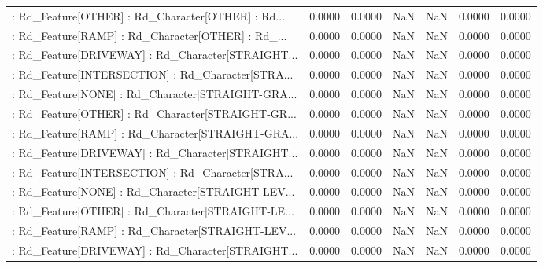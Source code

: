 \begin{longtable}{p{4cm}cccccc}
 : Rd\_Feature[OTHER] : Rd\_Character[OTHER] : Rd... &            0.0000 &            0.0000 &     NaN &          NaN &             0.0000 &            0.0000 \\
 : Rd\_Feature[RAMP] : Rd\_Character[OTHER] : Rd\_... &            0.0000 &            0.0000 &     NaN &          NaN &             0.0000 &            0.0000 \\
 : Rd\_Feature[DRIVEWAY] : Rd\_Character[STRAIGHT... &            0.0000 &            0.0000 &     NaN &          NaN &             0.0000 &            0.0000 \\
 : Rd\_Feature[INTERSECTION] : Rd\_Character[STRA... &            0.0000 &            0.0000 &     NaN &          NaN &             0.0000 &            0.0000 \\
 : Rd\_Feature[NONE] : Rd\_Character[STRAIGHT-GRA... &            0.0000 &            0.0000 &     NaN &          NaN &             0.0000 &            0.0000 \\
 : Rd\_Feature[OTHER] : Rd\_Character[STRAIGHT-GR... &            0.0000 &            0.0000 &     NaN &          NaN &             0.0000 &            0.0000 \\
 : Rd\_Feature[RAMP] : Rd\_Character[STRAIGHT-GRA... &            0.0000 &            0.0000 &     NaN &          NaN &             0.0000 &            0.0000 \\
 : Rd\_Feature[DRIVEWAY] : Rd\_Character[STRAIGHT... &            0.0000 &            0.0000 &     NaN &          NaN &             0.0000 &            0.0000 \\
 : Rd\_Feature[INTERSECTION] : Rd\_Character[STRA... &            0.0000 &            0.0000 &     NaN &          NaN &             0.0000 &            0.0000 \\
 : Rd\_Feature[NONE] : Rd\_Character[STRAIGHT-LEV... &            0.0000 &            0.0000 &     NaN &          NaN &             0.0000 &            0.0000 \\
 : Rd\_Feature[OTHER] : Rd\_Character[STRAIGHT-LE... &            0.0000 &            0.0000 &     NaN &          NaN &             0.0000 &            0.0000 \\
 : Rd\_Feature[RAMP] : Rd\_Character[STRAIGHT-LEV... &            0.0000 &            0.0000 &     NaN &          NaN &             0.0000 &            0.0000 \\
 : Rd\_Feature[DRIVEWAY] : Rd\_Character[STRAIGHT... &            0.0000 &            0.0000 &     NaN &          NaN &             0.0000 &            0.0000 \\

\end{longtable}
